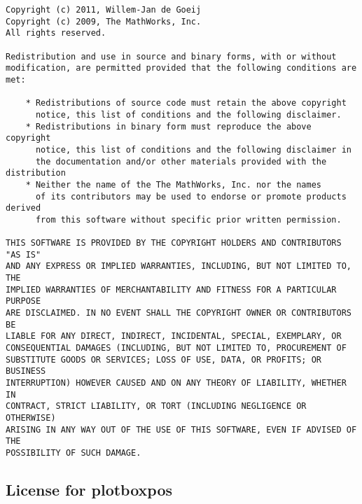 \documentclass[a4paper, oneside, onecolumn, 11pt]{article}
\begin{document}
\begingroup
\footnotesize
\begin{verbatim}
Copyright (c) 2011, Willem-Jan de Goeij
Copyright (c) 2009, The MathWorks, Inc.
All rights reserved.

Redistribution and use in source and binary forms, with or without
modification, are permitted provided that the following conditions are
met:

    * Redistributions of source code must retain the above copyright
      notice, this list of conditions and the following disclaimer.
    * Redistributions in binary form must reproduce the above copyright
      notice, this list of conditions and the following disclaimer in
      the documentation and/or other materials provided with the distribution
    * Neither the name of the The MathWorks, Inc. nor the names
      of its contributors may be used to endorse or promote products derived
      from this software without specific prior written permission.

THIS SOFTWARE IS PROVIDED BY THE COPYRIGHT HOLDERS AND CONTRIBUTORS "AS IS"
AND ANY EXPRESS OR IMPLIED WARRANTIES, INCLUDING, BUT NOT LIMITED TO, THE
IMPLIED WARRANTIES OF MERCHANTABILITY AND FITNESS FOR A PARTICULAR PURPOSE
ARE DISCLAIMED. IN NO EVENT SHALL THE COPYRIGHT OWNER OR CONTRIBUTORS BE
LIABLE FOR ANY DIRECT, INDIRECT, INCIDENTAL, SPECIAL, EXEMPLARY, OR
CONSEQUENTIAL DAMAGES (INCLUDING, BUT NOT LIMITED TO, PROCUREMENT OF
SUBSTITUTE GOODS OR SERVICES; LOSS OF USE, DATA, OR PROFITS; OR BUSINESS
INTERRUPTION) HOWEVER CAUSED AND ON ANY THEORY OF LIABILITY, WHETHER IN
CONTRACT, STRICT LIABILITY, OR TORT (INCLUDING NEGLIGENCE OR OTHERWISE)
ARISING IN ANY WAY OUT OF THE USE OF THIS SOFTWARE, EVEN IF ADVISED OF THE
POSSIBILITY OF SUCH DAMAGE.
\end{verbatim}
\endgroup

\subsection{License for plotboxpos}
\end{document}
